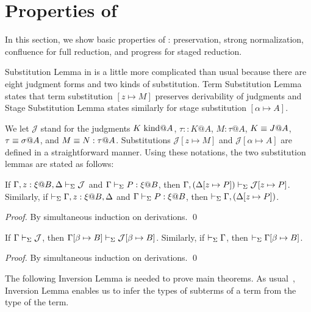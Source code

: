 
\section{Properties of \LMD \label{sec:properties}}

In this section, we show basic properties of \LMD: preservation, strong normalization, confluence for full reduction, and progress for staged reduction.


Substitution Lemma in \LMD{} is a little more complicated than usual
because there are eight judgment forms and two kinds of substitution.
Term Substitution Lemma states that term substitution $[z \mapsto M]$
preserves derivability of judgments and Stage Substitution Lemma
states similarly for stage substitution $[\alpha\mapsto A]$.

We let $\mathcal{J}$ stand for the judgments $K \text{\ kind} @A$, $\tau::K@A$,
$M:\tau@A$, $K \equiv J @ A$, $\tau \equiv \sigma @ A$, and
$M \equiv N : \tau @ A$.  Substitutions $\mathcal{J}[z \mapsto M]$ and
$\mathcal{J}[\alpha \mapsto A]$ are defined in a straightforward
manner.  Using these notations, the two substitution lemmas are stated as follows:

\begin{lemma}
  If $\G, z:\xi@B, \D \V \mathcal{J}$ and $\Gamma\vdash_\Sigma P:\xi @B$, then $\Gamma, (\Delta[z \mapsto P]) \vdash_\Sigma \mathcal{J}[z \mapsto P]$.  Similarly, if $\V \G, z:\xi@B, \D$ and
  $\Gamma\vdash_\Sigma P:\xi @B$, then $\vdash_\Sigma \Gamma, (\Delta[z \mapsto P])$.
\end{lemma}

\begin{proof}
  By simultaneous induction on derivations.
 \qed
\end{proof}

\begin{lemma}
	If $\Gamma \vdash_\Sigma \mathcal{J}$, then $\Gamma[\beta\mapsto B] \vdash_\Sigma \mathcal{J}[\beta\mapsto B]$.  Similarly, if $\vdash_\Sigma \Gamma$, then $\vdash_\Sigma \Gamma[\beta\mapsto B]$.
\end{lemma}

\begin{proof}
  By simultaneous induction on derivations.
  \qed
\end{proof}


The following Inversion Lemma is needed to prove main theorems.
As usual~\cite{TAPL}, Inversion Lemma enables us to infer the types of subterms of a term from the type of the term.

